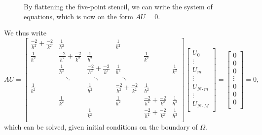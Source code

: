 \begin{figure}[htb]
    \centering
    
    \label{ex3:fig:flat_stencil}
    \caption{By flattening the five-point stencil, we can write the system of equations, which is now on the form $AU = 0$.} 
\end{figure}

We thus write
\begin{equation*}
    \renewcommand{\arraystretch}{2.5} %
    AU = 
    \begin{bmatrix}
        \frac{-2}{h^2} + \frac{-2}{k^2} & \frac{1}{h^2} &&\frac{1}{k^2}\\
        \frac{1}{h^2} & \frac{-2}{h^2} + \frac{-2}{k^2}   & \frac{1}{h^2} &&\frac{1}{k^2}\\
        & \frac{1}{h^2} & \frac{-2}{h^2} + \frac{-2}{k^2}   & \frac{1}{h^2} &&\frac{1}{k^2}\\
        &  \quad \ddots & \quad \ddots  & \quad \ddots \\
        \frac{1}{k^2} && \frac{1}{h^2} & \frac{-2}{h^2} + \frac{-2}{k^2} & \frac{1}{h^2} \\
        & \frac{1}{k^2} && \frac{1}{h^2} & \frac{-2}{h^2} + \frac{-2}{k^2}   & \frac{1}{h^2} \\
        && \frac{1}{k^2} && \frac{-2}{h^2} + \frac{-2}{k^2} & \frac{1}{h^2} \\
    \end{bmatrix}
    \begin{bmatrix}
    U_{0} \\ \vdots \\ U_{m} \\ \vdots \\ U_{N \cdot m} \\ \vdots \\ U_{N \cdot M} \\
    \end{bmatrix}
    =
    \begin{bmatrix}
    0 \\ 0 \\ 0 \\ \vdots \\ 0 \\ 0 \\ 0 \\
    \end{bmatrix}
    = 0,
    \label{ex3:eq:solution_equation}
\end{equation*}
which can be solved, given initial conditions on the boundary of $\Omega$.
